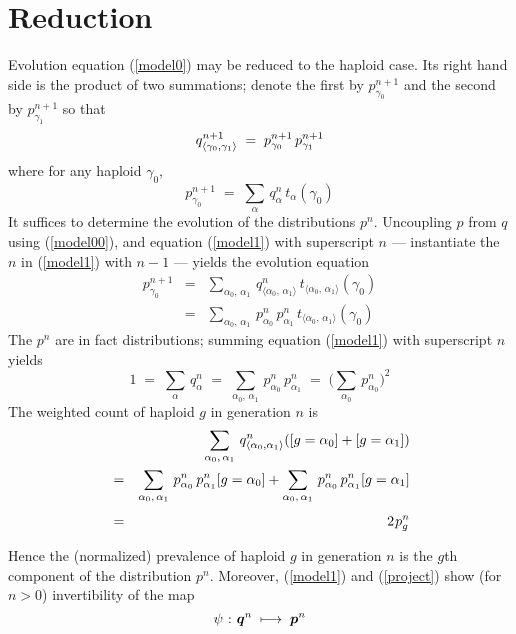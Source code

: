 \section{Reduction}
Evolution equation (\ref{model0}) may be reduced to the haploid case.
Its right hand side is the product of two summations; denote the first
by $p_{\gamma_0}^{n+1}$ and the second by $p_{\gamma_1}^{n+1}$ so that
\begin{equation}
\label{model1}
q_{\langle \gamma_0, \gamma_1 \rangle}^{n+1} \; = \;
p_{\gamma_0}^{n+1} \, p_{\gamma_1}^{n+1}\\[.05in]
\end{equation}
where for any haploid $\gamma_0$,
\begin{equation}
\label{model00}
p_{\gamma_0}^{n+1} \; = \;
\sum_{\alpha} \,q_\alpha^n \, t_\alpha(\gamma_0)
\end{equation}
It suffices to determine the evolution of the distributions $p^{n}$.
Uncoupling \nudge $p$ \nudge from \nudge $q$ \nudge using
(\ref{model00}), and equation (\ref{model1}) with superscript $n$ ---
instantiate the $n$ in (\ref{model1}) with $n-1$ --- yields the
evolution equation
\begin{eqnarray}
\label{model2}
p_{\gamma_0}^{n+1} & = &
\sum_{\alpha_0, \, \alpha_1} \, q_{\langle \alpha_0, \,\alpha_1 \rangle}^n \,
t_{\langle \alpha_0, \,\alpha_1 \rangle}(\gamma_0) \nonumber \\
& = &
\sum_{\alpha_0, \, \alpha_1} \, p_{\alpha_0}^n \, p_{\alpha_1}^n \,
t_{\langle \alpha_0, \,\alpha_1 \rangle}(\gamma_0) 
\end{eqnarray}
The $p^n$ are in fact distributions; summing equation
(\ref{model1}) with superscript $n$ yields
\[
1 \; = \; \sum_\alpha \, q_\alpha^n \; = \;
\sum_{\alpha_0, \, \alpha_1} \, p_{\alpha_0}^n \, p_{\alpha_1}^n \; = \;
\Big( \sum_{\alpha_0} \, p_{\alpha_0}^n \Big)^2
\]
The weighted count of haploid
$g$ in generation $n$ is
\begin{eqnarray}
\label{project}
  & &
  \sum_{\alpha_0, \, \alpha_1} \, q_{\langle \alpha_0, \alpha_1 \rangle}^n
([g = \alpha_0] + [g = \alpha_1]) \\ & = &
\sum_{\alpha_0, \, \alpha_1} \, p_{\alpha_0}^n \, p_{\alpha_1}^n [g = \alpha_0] + 
\sum_{\alpha_0, \, \alpha_1} \, p_{\alpha_0}^n \, p_{\alpha_1}^n [g = \alpha_1] \\[0.05in]
& = & 2 \hspace{0.01in} p_g^n
\end{eqnarray}

Hence the (normalized) prevalence of haploid $g$ in generation $n$ is 
the $g$th component of the distribution $p^n$. Moreover, 
(\ref{model1}) and (\ref{project}) show (for $n > 0$) invertibility of the map
\[
  \psi \hspace{0.01in} : \hspace{0.01in} {\bm q}^{n} \; \longmapsto \; {\bm p}^{n}
\]

